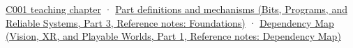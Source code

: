 \hypertarget{appendix-5bee2df85484-source-and-navigation}{}

\hyperref[01-foundations-i-ch001-from-a-signal-to-an-interpretation]{C001 teaching chapter} · \href{../01-Bits-Programs-and-Reliable-Systems-P03/main.pdf\#nameddest=appendix-fd090d982a15}{Part definitions and mechanisms (Bits, Programs, and Reliable Systems, Part 3, Reference notes: Foundations)} · \href{../07-Vision-XR-and-Playable-Worlds-P01/main.pdf\#nameddest=appendix-4ad47bdd269a}{Dependency Map (Vision, XR, and Playable Worlds, Part 1, Reference notes: Dependency Map)}
